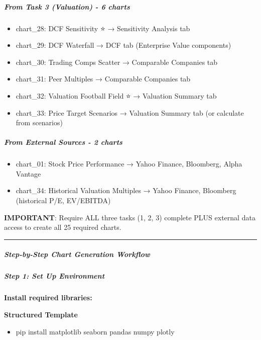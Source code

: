 \documentclass[11pt]{article}
\begin{document}
\subparagraph{From Task 3 (Valuation) - 6 charts}\mbox{}\par
\begin{itemize}[leftmargin=*,itemsep=2pt,topsep=2pt]
\item {} chart\_\allowbreak{}28: DCF Sensitivity ⭐ → Sensitivity Analysis tab
\item {} chart\_\allowbreak{}29: DCF Waterfall → DCF tab (Enterprise Value components)
\item {} chart\_\allowbreak{}30: Trading Comps Scatter → Comparable Companies tab
\item {} chart\_\allowbreak{}31: Peer Multiples → Comparable Companies tab
\item {} chart\_\allowbreak{}32: Valuation Football Field ⭐ → Valuation Summary tab
\item {} chart\_\allowbreak{}33: Price Target Scenarios → Valuation Summary tab (or calculate from scenarios)
\end{itemize}

\subparagraph{From External Sources - 2 charts}\mbox{}\par
\begin{itemize}[leftmargin=*,itemsep=2pt,topsep=2pt]
\item {} chart\_\allowbreak{}01: Stock Price Performance → Yahoo Finance, Bloomberg, Alpha Vantage
\item {} chart\_\allowbreak{}34: Historical Valuation Multiples → Yahoo Finance, Bloomberg (historical P/E, EV/EBITDA)
\end{itemize}

\textbf{IMPORTANT}: Require ALL three tasks (1, 2, 3) complete PLUS external data access to create all 25 required charts.


\vspace{0.5em}\hrule\vspace{0.5em}

\subparagraph{Step-by-Step Chart Generation Workflow}\mbox{}\par

\subparagraph{Step 1: Set Up Environment}\mbox{}\par

\textbf{Install required libraries:}

\textbf{Structured Template}
\begin{itemize}[leftmargin=*,itemsep=2pt,topsep=2pt]
\item {} pip install matplotlib seaborn pandas numpy plotly
\end{itemize}
\end{document}
